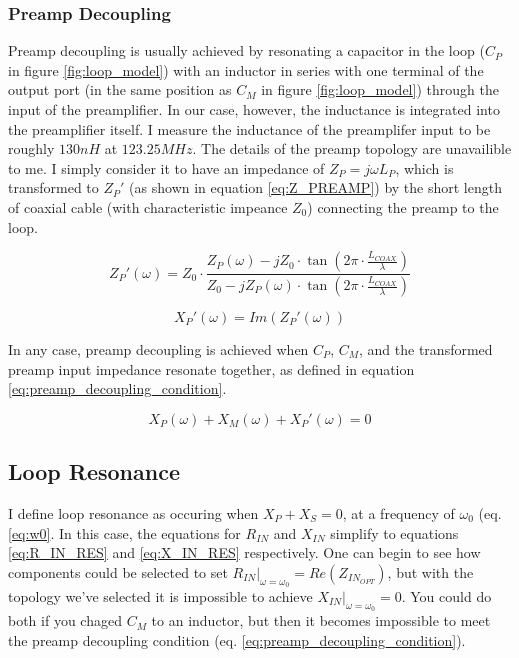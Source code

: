 \subsubsection{Preamp Decoupling}
Preamp decoupling is usually achieved by resonating a capacitor in the loop ($C_P$ in figure \ref{fig:loop_model}) with
an inductor in series with one terminal of the output port (in the same position as $C_M$ in figure
\ref{fig:loop_model}) through the input of the preamplifier. In our case, however, the inductance is integrated into the
preamplifier itself. I measure the inductance of the preamplifer input to be roughly $130nH$ at $123.25 MHz$. The
details of the preamp topology are unavailible to me. I simply consider it to have an impedance of $Z_P=j\omega L_P$,
which is transformed to ${Z_P}'$ (as shown in equation \ref{eq:Z_PREAMP}) by the short length of coaxial cable (with
characteristic impeance $Z_0$) connecting the preamp to the loop.

\begin{equation} \label{eq:Z_PREAMP}
    {Z_P}'(\omega)=Z_0 \cdot \frac{Z_P(\omega)-j Z_0 \cdot \tan(2\pi\cdot\frac{L_{COAX}}{\lambda})}{Z_0 - j Z_P(\omega) \cdot
    \tan(2\pi\cdot\frac{L_{COAX}}{\lambda})}
\end{equation}

\begin{equation} \label{eq:X_PREAMP}
    {X_P}'(\omega)=Im({Z_P}'(\omega))
\end{equation}
    
In any case, preamp decoupling is achieved when $C_P$, $C_M$, and the transformed preamp input impedance resonate
together, as defined in equation \ref{eq:preamp_decoupling_condition}.

\begin{equation} \label{eq:preamp_decoupling_condition}
    X_P(\omega) + X_M(\omega) +{X_P}'(\omega) = 0
\end{equation}


\subsection{Loop Resonance}

I define loop resonance as occuring when $X_P + X_S = 0$, at a frequency of $\omega_0$ (eq. \ref{eq:w0}. In this case, the equations for
$R_{IN}$ and $X_{IN}$ simplify to equations \ref{eq:R_IN_RES} and \ref{eq:X_IN_RES} respectively. One can begin to see
how components could be selected to set $R_{IN}\big|_{\omega=\omega_0}=Re(Z_{IN_{OPT}})$, but with the topology we've selected it is impossible
to achieve $X_{IN}\big|_{\omega=\omega_0}=0$. You could do both if you chaged $C_M$ to an inductor, but then it becomes
impossible to meet the preamp decoupling condition (eq. \ref{eq:preamp_decoupling_condition}).



